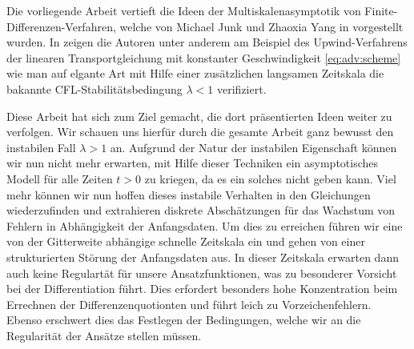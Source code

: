 
Die vorliegende Arbeit vertieft die Ideen der Multiskalenasymptotik von Finite-Differenzen-Verfahren, welche von Michael Junk und Zhaoxia Yang in \cite{Junk2004} vorgestellt wurden. 
In \cite{Junk2004} zeigen die Autoren unter anderem am Beispiel des Upwind-Verfahrens der linearen Transportgleichung mit konstanter Geschwindigkeit \eqref{eq:adv:scheme} wie man auf elgante Art mit Hilfe einer zusätzlichen langsamen Zeitskala die bakannte CFL-Stabilitätsbedingung $\lambda < 1$ verifiziert.

Diese Arbeit hat sich zum Ziel gemacht, die dort präsentierten Ideen weiter zu verfolgen.
Wir schauen uns hierfür durch die gesamte Arbeit ganz bewusst den instabilen Fall $\lambda > 1$ an.
Aufgrund der Natur der instabilen Eigenschaft können wir nun nicht mehr erwarten, mit Hilfe dieser Techniken ein asymptotisches Modell für alle Zeiten $t > 0$ zu kriegen, da es ein solches nicht geben kann.
Viel mehr können wir nun hoffen dieses instabile Verhalten in den Gleichungen wiederzufinden und extrahieren diskrete Abschätzungen für das Wachstum von Fehlern in Abhängigkeit der Anfangsdaten.
Um dies zu erreichen führen wir eine von der Gitterweite abhängige schnelle Zeitskala ein und gehen von einer strukturierten Störung der Anfangsdaten aus.
In dieser Zeitskala erwarten dann auch keine Regulartät für unsere Ansatzfunktionen, was zu besonderer Vorsicht bei der Differentiation führt.
Dies erfordert besonders hohe Konzentration beim Errechnen der Differenzenquotionten und führt leich zu Vorzeichenfehlern.
Ebenso erschwert dies das Festlegen der Bedingungen, welche wir an die Regularität der Ansätze stellen müssen.
